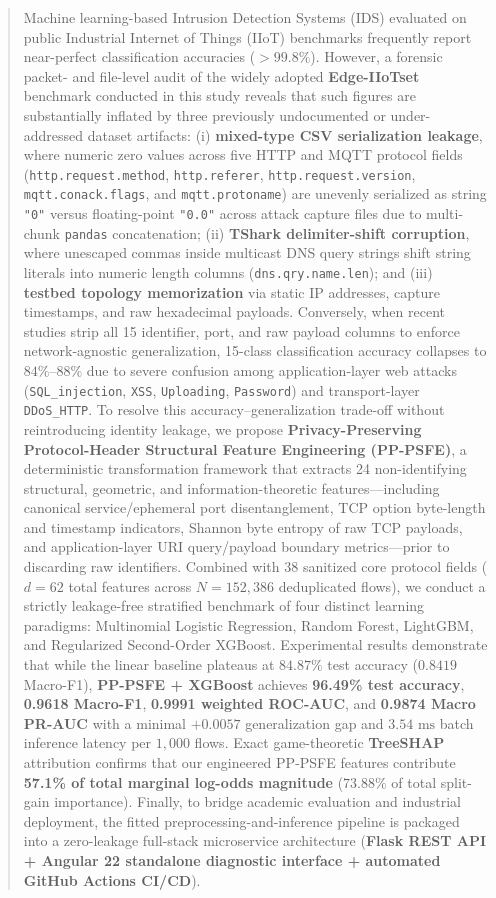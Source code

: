 \documentclass[conference]{IEEEtran}
\begin{document}
\begin{abstract}
Machine learning-based Intrusion Detection Systems (IDS) evaluated on public Industrial Internet of Things (IIoT) benchmarks frequently report near-perfect classification accuracies ($>99.8\%$). However, a forensic packet- and file-level audit of the widely adopted \textbf{Edge-IIoTset} benchmark conducted in this study reveals that such figures are substantially inflated by three previously undocumented or under-addressed dataset artifacts: (i) \textbf{mixed-type CSV serialization leakage}, where numeric zero values across five HTTP and MQTT protocol fields (\texttt{http.request.method}, \texttt{http.referer}, \texttt{http.request.version}, \texttt{mqtt.conack.flags}, and \texttt{mqtt.protoname}) are unevenly serialized as string \texttt{"0"} versus floating-point \texttt{"0.0"} across attack capture files due to multi-chunk \texttt{pandas} concatenation; (ii) \textbf{TShark delimiter-shift corruption}, where unescaped commas inside multicast DNS query strings shift string literals into numeric length columns (\texttt{dns.qry.name.len}); and (iii) \textbf{testbed topology memorization} via static IP addresses, capture timestamps, and raw hexadecimal payloads. Conversely, when recent studies strip all 15 identifier, port, and raw payload columns to enforce network-agnostic generalization, 15-class classification accuracy collapses to $84\%\text{--}88\%$ due to severe confusion among application-layer web attacks (\texttt{SQL\_injection}, \texttt{XSS}, \texttt{Uploading}, \texttt{Password}) and transport-layer \texttt{DDoS\_HTTP}. To resolve this accuracy--generalization trade-off without reintroducing identity leakage, we propose \textbf{Privacy-Preserving Protocol-Header Structural Feature Engineering (PP-PSFE)}, a deterministic transformation framework that extracts 24 non-identifying structural, geometric, and information-theoretic features---including canonical service/ephemeral port disentanglement, TCP option byte-length and timestamp indicators, Shannon byte entropy of raw TCP payloads, and application-layer URI query/payload boundary metrics---prior to discarding raw identifiers. Combined with 38 sanitized core protocol fields ($d=62$ total features across $N=152,386$ deduplicated flows), we conduct a strictly leakage-free stratified benchmark of four distinct learning paradigms: Multinomial Logistic Regression, Random Forest, LightGBM, and Regularized Second-Order XGBoost. Experimental results demonstrate that while the linear baseline plateaus at $84.87\%$ test accuracy ($0.8419$ Macro-F1), \textbf{PP-PSFE + XGBoost} achieves \textbf{96.49\% test accuracy}, \textbf{0.9618 Macro-F1}, \textbf{0.9991 weighted ROC-AUC}, and \textbf{0.9874 Macro PR-AUC} with a minimal $+0.0057$ generalization gap and $3.54\text{ ms}$ batch inference latency per $1,000$ flows. Exact game-theoretic \textbf{TreeSHAP} attribution confirms that our engineered PP-PSFE features contribute \textbf{57.1\% of total marginal log-odds magnitude} ($73.88\%$ of total split-gain importance). Finally, to bridge academic evaluation and industrial deployment, the fitted preprocessing-and-inference pipeline is packaged into a zero-leakage full-stack microservice architecture (\textbf{Flask REST API + Angular 22 standalone diagnostic interface + automated GitHub Actions CI/CD}).

\end{abstract}
\end{document}
